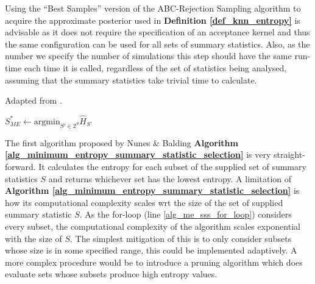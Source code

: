 \documentclass[11pt,a4paper]{article}
\theoremstyle{break}
\begin{document}
  \par Using the ``Best Samples'' version of the ABC-Rejection Sampling algorithm to acquire the approximate posterior used in \textbf{Definition \ref{def_knn_entropy}} is advisable as it does not require the specification of an acceptance kernel and thus the same configuration can be used for all sets of summary statistics. Also, as the number we specify the number of simulations this step should have the same run-time each time it is called, regardless of the set of statistics being analysed, assuming that the summary statistics take trivial time to calculate.

  \begin{box_algorithm}\label{alg_minimum_entropy_summary_statistic_selection}
    Adapted from \cite[]{on_optimal_selection_of_summary_stats_for_ABC}.
    \par
    \begin{algorithm}[H]
      $S_{ME}^*\leftarrow\text{argmin}_{S'\in 2^S}\hat{H}_{S'}$\\
    \end{algorithm}
  \end{box_algorithm}

  \par The first algorithm proposed by Nunes \& Balding \textbf{Algorithm \ref{alg_minimum_entropy_summary_statistic_selection}} is very straight-forward. It calculates the entropy for each subset of the supplied set of summary statistics $S$ and returns whichever set has the lowest entropy. A limitation of \textbf{Algorithm \ref{alg_minimum_entropy_summary_statistic_selection}} is how its computational complexity scales wrt the size of the set of supplied summary statistic $S$. As the for-loop (line \ref{alg_me_sss_for_loop}) considers every subset, the computational complexity of the algorithm scales exponential with the size of $S$. The simplest mitigation of this is to only consider subsets whose size is in some specified range, this could be implemented adaptively. A more complex procedure would be to introduce a pruning algorithm which does evaluate sets whose subsets produce high entropy values.
\end{document}
